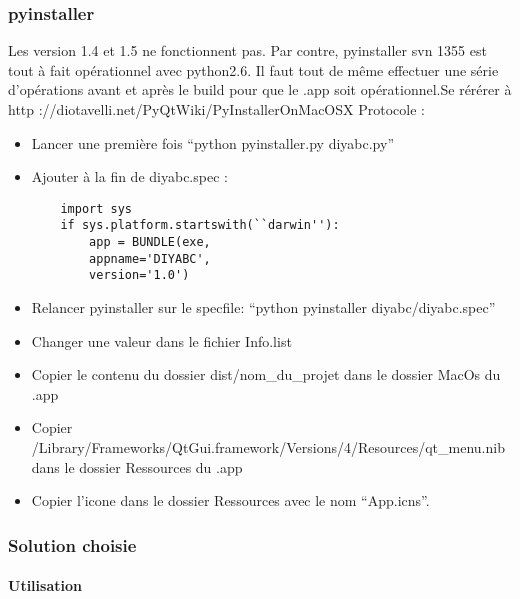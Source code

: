 \documentclass[12pt,a4paper]{article}
\begin{document}
        \subsubsection{pyinstaller}

        Les version 1.4 et 1.5 ne fonctionnent pas. Par contre, pyinstaller svn
        1355 est tout à fait op\'erationnel avec python2.6. Il faut tout de même
        effectuer une s\'erie d'op\'erations avant et après le build pour que le
        .app soit op\'erationnel.Se r\'er\'erer à \newline http
        ://diotavelli.net/PyQtWiki/PyInstallerOnMacOSX \newline Protocole : \\

        \label{mac_pyinstaller}
        \begin{itemize}
            \item Lancer une première fois ``python pyinstaller.py diyabc.py''
            \item Ajouter à la fin de diyabc.spec :
        \begin{verbatim}
    import sys 
    if sys.platform.startswith(``darwin''): 
        app = BUNDLE(exe, 
        appname='DIYABC', 
        version='1.0')
        \end{verbatim}
            \item Relancer pyinstaller sur le specfile: ``python pyinstaller diyabc/diyabc.spec''
            \item Changer une valeur dans le fichier Info.list
            \item Copier le contenu du dossier dist/nom\_du\_projet dans le dossier MacOs du .app
            \item Copier /Library/Frameworks/QtGui.framework/Versions/4/Resources/qt\_menu.nib dans le dossier Ressources du .app
            \item Copier l'icone dans le dossier Ressources avec le nom ``App.icns''.\\
        \end{itemize}

        \subsubsection{Solution choisie}
        \paragraph{Utilisation}
\end{document}
